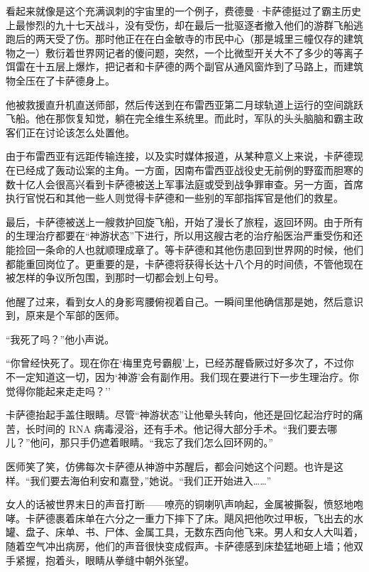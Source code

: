 \documentclass[AutoFakeBold=true]{book}
\begin{document}
\vspace*{1em}

看起来就像是这个充满讽刺的宇宙里的一个例子，费德曼·卡萨德挺过了霸主历史上最惨烈的九十七天战斗，没有受伤，却在最后一批驱逐者撤入他们的游群飞船逃跑后的两天受了伤。那时他正在在白金敏寺的市民中心（那是城里三幢仅存的建筑物之一）敷衍着世界网记者的傻问题，突然，一个比微型开关大不了多少的等离子饵雷在十五层上爆炸，把记者和卡萨德的两个副官从通风窗炸到了马路上，而建筑物全压在了卡萨德身上。

他被救援直升机直送师部，然后传送到在布雷西亚第二月球轨道上运行的空间跳跃飞船。他在那恢复知觉，躺在完全维生系统里。而此时，军队的头头脑脑和霸主政客们正在讨论该怎么处置他。

由于布雷西亚有远距传输连接，以及实时媒体报道，从某种意义上来说，卡萨德现在已经成了轰动讼案的主角。一方面，因南布雷西亚战役史无前例的野蛮而胆寒的数十亿人会很高兴看到卡萨德被送上军事法庭或受到战争罪审查。另一方面，首席执行官悦石和其他一些人则觉得卡萨德和一些别的军部指挥官是他们的救星。

最后，卡萨德被送上一艘救护回旋飞船，开始了漫长了旅程，返回环网。由于所有的生理治疗都要在``神游状态''下进行，所以用这艘古老的治疗船医治严重受伤和还能捡回一条命的人也就顺理成章了。等卡萨德和其他伤患回到世界网的时候，他们都能重回岗位了。更重要的是，卡萨德将获得长达十八个月的时间债，不管他现在被怎样的争议所包围，到那时一切都会划上句号。

\vspace*{1em}

他醒了过来，看到女人的身影弯腰俯视着自己。一瞬间里他确信那是她，然后意识到，原来是个军部的医师。

``我死了吗？''他小声说。

``你曾经快死了。现在你在`梅里克号霸舰'上，已经苏醒昏厥过好多次了，不过你不一定知道这一切，因为`神游'会有副作用。我们现在要进行下一步生理治疗。你觉得你能起来走走吗？''

卡萨德抬起手盖住眼睛。尽管``神游状态''让他晕头转向，他还是回忆起治疗时的痛苦，长时间的 RNA 病毒浸浴，还有手术。他记得大部分手术。``我们要去哪儿？''他问，那只手仍遮着眼睛。``我忘了我们怎么回环网的。''

医师笑了笑，仿佛每次卡萨德从神游中苏醒后，都会问她这个问题。也许是这样。``我们要去海伯利安和嘉登，''她说。``我们正开始进入……''

女人的话被世界末日的声音打断——嘹亮的铜喇叭声响起，金属被撕裂，愤怒地咆哮。卡萨德裹着床单在六分之一重力下摔下了床。飓风把他吹过甲板，飞出去的水罐、盘子、床单、书、尸体、金属工具，无数东西向他飞来。男人和女人大叫着，随着空气冲出病房，他们的声音很快变成假声。卡萨德感到床垫猛地砸上墙；他双手紧握，抱着头，眼睛从拳缝中朝外张望。
\end{document}
